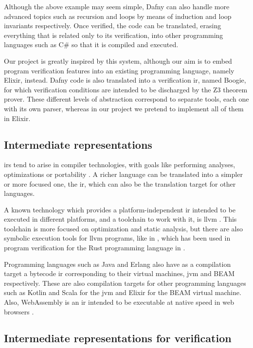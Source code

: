 Although the above example may seem simple, Dafny can also handle more advanced
topics such as recursion and loops by means of induction and loop invariants
respectively. Once verified, the code can be translated, erasing everything that
is related only to its verification, into other programming languages such as
C\# so that it is compiled and executed. 

Our project is greatly inspired by this system, although our aim is to embed
program verification features into an existing programming language, namely
Elixir, instead. Dafny code is also translated into a verification \gls{ir}, 
named Boogie, for which verification conditions are intended to be discharged by
the Z3 theorem prover. These different levels of abstraction correspond to
separate tools, each one with its own parser, whereas in our project we pretend
to implement all of them in Elixir.

\subsection{Intermediate representations}

\gls{ir}s tend to arise in compiler technologies, with goals like performing
analyses, optimizations or portability \citep{FormalizingLLVMIR}. A richer
language can be translated into a simpler or more focused one, the \gls{ir},
which can also be the translation target for other languages.

A known technology which provides a platform-independent \gls{ir} intended to be
executed in different platforms, and a toolchain to work with it, is \gls{llvm}
\citep{LLVM}. This toolchain is more focused on optimization and static
analysis, but there are also symbolic execution tools for \gls{llvm} programs,
like in \cite{cadar2008klee}, which has been used in program verification for
the Rust programming language in \citep{lindner2018no}.

Programming languages such as Java and Erlang also have as a compilation target
a bytecode \gls{ir} corresponding to their virtual machines, \gls{jvm} 
\citep{lindholm2013java} and BEAM \citep{stenman2015erlang} respectively. These
are also compilation targets for other programming languages such as Kotlin and
Scala for the \gls{jvm} and Elixir for the BEAM virtual machine.  Also,
WebAssembly is an \gls{ir} intended to be executable at native speed in web
browsers \citep{wasm}.

\subsection{Intermediate representations for verification}

